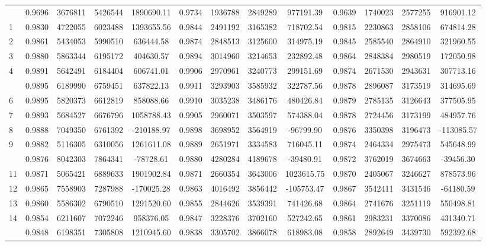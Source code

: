 \documentclass[
  12pt,
]{article}
\begin{document}
\begin{longtable}[t]{lcccccccccccc}
\endfoot
\bottomrule
\endlastfoot
0 & 0.9696 & 3676811 & 5426544 & 1890690.11 & 0.9734 & 1936788 & 2849289 & 977191.39 & 0.9639 & 1740023 & 2577255 & 916901.12\\
1 & 0.9830 & 4722055 & 6023488 & 1393655.56 & 0.9844 & 2491192 & 3165382 & 718702.54 & 0.9815 & 2230863 & 2858106 & 674814.28\\
2 & 0.9861 & 5434053 & 5990510 & 636444.58 & 0.9874 & 2848513 & 3125600 & 314975.19 & 0.9845 & 2585540 & 2864910 & 321960.55\\
3 & 0.9880 & 5863344 & 6195172 & 404630.57 & 0.9894 & 3014960 & 3214653 & 232892.48 & 0.9864 & 2848384 & 2980519 & 172050.98\\
4 & 0.9891 & 5642491 & 6184404 & 606741.01 & 0.9906 & 2970961 & 3240773 & 299151.69 & 0.9874 & 2671530 & 2943631 & 307713.16\\
\addlinespace
5 & 0.9895 & 6189990 & 6759451 & 637822.13 & 0.9911 & 3293903 & 3585932 & 322787.56 & 0.9878 & 2896087 & 3173519 & 314695.69\\
6 & 0.9895 & 5820373 & 6612819 & 858088.66 & 0.9910 & 3035238 & 3486176 & 480426.84 & 0.9879 & 2785135 & 3126643 & 377505.95\\
7 & 0.9893 & 5684527 & 6676796 & 1058788.43 & 0.9905 & 2960071 & 3503597 & 574388.04 & 0.9878 & 2724456 & 3173199 & 484957.76\\
8 & 0.9888 & 7049350 & 6761392 & -210188.97 & 0.9898 & 3698952 & 3564919 & -96799.90 & 0.9876 & 3350398 & 3196473 & -113085.57\\
9 & 0.9882 & 5116305 & 6310056 & 1261611.08 & 0.9889 & 2651971 & 3334583 & 716045.11 & 0.9874 & 2464334 & 2975473 & 545648.99\\
\addlinespace
10 & 0.9876 & 8042303 & 7864341 & -78728.61 & 0.9880 & 4280284 & 4189678 & -39480.91 & 0.9872 & 3762019 & 3674663 & -39456.30\\
11 & 0.9871 & 5065421 & 6889633 & 1901902.84 & 0.9871 & 2660354 & 3643006 & 1023615.75 & 0.9870 & 2405067 & 3246627 & 878573.96\\
12 & 0.9865 & 7558903 & 7287988 & -170025.28 & 0.9863 & 4016492 & 3856442 & -105753.47 & 0.9867 & 3542411 & 3431546 & -64180.59\\
13 & 0.9860 & 5586302 & 6790510 & 1291520.60 & 0.9855 & 2844626 & 3539391 & 741426.68 & 0.9864 & 2741676 & 3251119 & 550498.81\\
14 & 0.9854 & 6211607 & 7072246 & 958376.05 & 0.9847 & 3228376 & 3702160 & 527242.65 & 0.9861 & 2983231 & 3370086 & 431340.71\\
\addlinespace
15 & 0.9848 & 6198351 & 7305808 & 1210945.60 & 0.9838 & 3305702 & 3866078 & 618983.08 & 0.9858 & 2892649 & 3439730 & 592392.68\\

\end{longtable}
\end{document}
